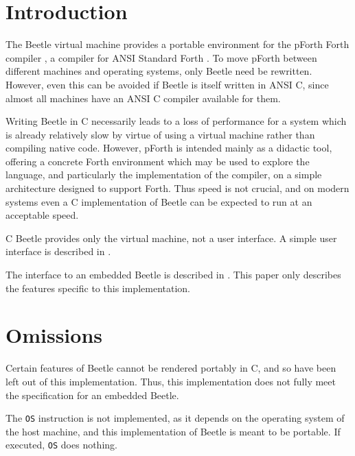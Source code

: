 %
%
%
%


\section{Introduction}

The Beetle virtual machine \cite{beetledis} provides a portable environment
for the pForth Forth compiler \cite{beetledis}, a compiler for ANSI Standard
Forth \cite{ANSIforth}. To move pForth between different machines and
operating systems, only Beetle need be rewritten. However, even this can be
avoided if Beetle is itself written in ANSI C, since almost all machines have
an ANSI C compiler available for them.

Writing Beetle in C necessarily leads to a loss of performance for a system
which is already relatively slow by virtue of using a virtual machine
rather than compiling native code. However, pForth is intended mainly as a
didactic tool, offering a concrete Forth environment which may be used to
explore the language, and particularly the implementation of the compiler, on
a simple architecture designed to support Forth. Thus speed is not crucial,
and on modern systems even a C implementation of Beetle can be expected to
run at an acceptable speed.

C Beetle provides only the virtual machine, not a user interface. A simple
user interface is described in \cite{beetledis}.

The interface to an embedded Beetle is described in \cite{beetledis}. This paper
only describes the features specific to this implementation.


\section{Omissions}
\label{omissions}

Certain features of Beetle cannot be rendered portably in C, and so have been
left out of this implementation. Thus, this implementation does not fully
meet the specification for an embedded Beetle.

The {\tt OS} instruction is not implemented, as it depends on the operating
system of the host machine, and this implementation of Beetle is meant to be
portable. If executed, {\tt OS} does nothing.

